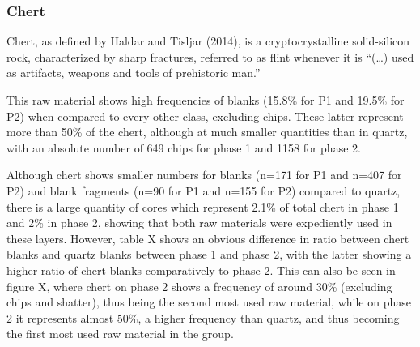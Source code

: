 \documentclass[12pt,twoside]{reedthesis}
\begin{document}
\begin{table}[!h]

\caption{\label{tab:quartzquality2}Quartz quality by class (Phase 2).}
\centering
{}
\end{table}
\hypertarget{chert}{%
\subsubsection{Chert}\label{chert}}

Chert, as defined by Haldar and Tisljar (2014), is a cryptocrystalline solid-silicon rock, characterized by sharp fractures, referred to as flint whenever it is ``(\ldots) used as artifacts, weapons and tools of prehistoric man.''

This raw material shows high frequencies of blanks (15.8\% for P1 and 19.5\% for P2) when compared to every other class, excluding chips. These latter represent more than 50\% of the chert, although at much smaller quantities than in quartz, with an absolute number of 649 chips for phase 1 and 1158 for phase 2.

Although chert shows smaller numbers for blanks (n=171 for P1 and n=407 for P2) and blank fragments (n=90 for P1 and n=155 for P2) compared to quartz, there is a large quantity of cores which represent 2.1\% of total chert in phase 1 and 2\% in phase 2, showing that both raw materials were expediently used in these layers. However, table X shows an obvious difference in ratio between chert blanks and quartz blanks between phase 1 and phase 2, with the latter showing a higher ratio of chert blanks comparatively to phase 2. This can also be seen in figure X, where chert on phase 2 shows a frequency of around 30\% (excluding chips and shatter), thus being the second most used raw material, while on phase 2 it represents almost 50\%, a higher frequency than quartz, and thus becoming the first most used raw material in the group.
\end{document}

